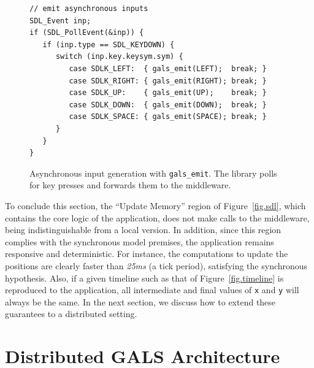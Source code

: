 \documentclass[sigplan,screen]{acmart}
\begin{document}
\begin{figure}[t]
{\scriptsize
\begin{verbatim}
// emit asynchronous inputs
SDL_Event inp;
if (SDL_PollEvent(&inp)) {
   if (inp.type == SDL_KEYDOWN) {
      switch (inp.key.keysym.sym) {
         case SDLK_LEFT:  { gals_emit(LEFT);  break; }
         case SDLK_RIGHT: { gals_emit(RIGHT); break; }
         case SDLK_UP:    { gals_emit(UP);    break; }
         case SDLK_DOWN:  { gals_emit(DOWN);  break; }
         case SDLK_SPACE: { gals_emit(SPACE); break; }
      }
   }
}
\end{verbatim}
}
  \caption{
    \label{fig.input}
    Asynchronous input generation with \texttt{gals\_emit}.
    The library polls for key presses and forwards them to the middleware.
  }
\end{figure}

To conclude this section, the ``Update Memory'' region of Figure~\ref{fig.sdl},
which contains the core logic of the application, does not make calls to the
middleware, being indistinguishable from a local version.
In addition, since this region complies with the synchronous model premises,
the application remains responsive and deterministic.
For instance, the computations to update the positions are clearly faster than
\emph{25ms} (a tick period), satisfying the synchronous hypothesis.
Also, if a given timeline such as that of Figure~\ref{fig.timeline} is
reproduced to the application, all intermediate and final values of \texttt{x}
and \texttt{y} will always be the same.
In the next section, we discuss how to extend these guarantees to a distributed
setting.

\section{Distributed GALS Architecture}
\label{sec.gals}
\end{document}
